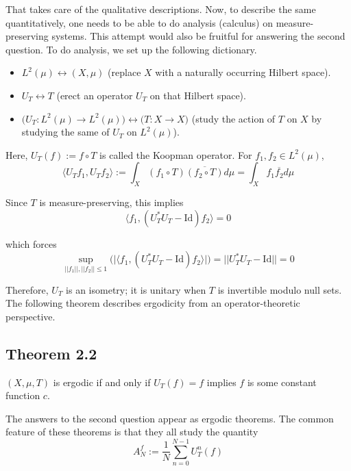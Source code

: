 \documentclass[11pt,a4paper]{article}
\begin{document}

That takes care of the qualitative descriptions. Now, to describe the same
quantitatively, one needs to be able to do analysis (calculus) on
measure-preserving systems. This attempt would also be fruitful for answering
the second question. To do analysis, we set up the following dictionary.
\begin{itemize}
    \item $L^2(\mu) \longleftrightarrow (X,\mu)$ (replace $X$ with a naturally occurring Hilbert space).
    \item $U_T \longleftrightarrow T$ (erect an operator $U_T$ on that Hilbert space).
    \item $\big(U_T:L^2(\mu) \rightarrow L^2(\mu)\big)\longleftrightarrow \big(T:X\rightarrow X\big)$ (study the action of $T$ on $X$ by studying the same of $U_T$ on $L^2(\mu)$).
\end{itemize}

Here, $U_T(f):= f\circ T$ is called the Koopman operator. For
$f_1,f_2\in L^2(\mu)$,
$$\langle U_Tf_1, U_Tf_2\rangle := \int_X (f_1\circ T)\overline{(f_2\circ T)}d\mu = \int_Xf_1\overline{f_2}d\mu$$

Since $T$ is measure-preserving, this implies
$$\langle f_1, (U_T^*U_T-\text{Id})f_2\rangle = 0$$

which forces
$$\sup_{||f_1||, ||f_2||\leq 1} \bigg(\big|\langle f_1, (U_T^*U_T-\text{Id})f_2\rangle\big|\bigg) = ||U_T^*U_T-\text{Id}|| = 0$$

Therefore, $U_T$ is an isometry; it is unitary when $T$ is invertible modulo
null sets. The following theorem describes ergodicity from an
operator-theoretic perspective.
\subsection*{Theorem 2.2}
    $(X, \mu, T)$ is ergodic if and only if $U_T(f) = f$ implies $f$ is some constant function $c$.


The answers to the second question appear as ergodic theorems. The common feature of these theorems is that they all study the quantity
$$A_N^f:= \frac{1}{N}\sum_{n=0}^{N-1}U_T^n(f)$$
\end{document}

